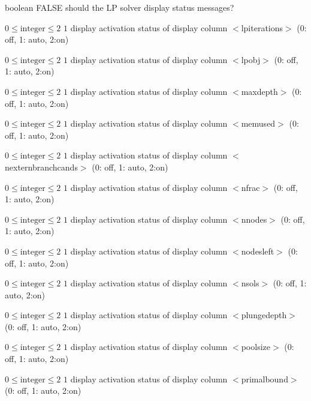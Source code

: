 %
{boolean}%
{FALSE}%
{should the LP solver display status messages?}%
{}

%
{$0\leq\textrm{integer}\leq2$}%
{$1$}%
{display activation status of display column $<$lpiterations$>$ (0: off, 1: auto, 2:on)}%
{}

%
{$0\leq\textrm{integer}\leq2$}%
{$1$}%
{display activation status of display column $<$lpobj$>$ (0: off, 1: auto, 2:on)}%
{}

%
{$0\leq\textrm{integer}\leq2$}%
{$1$}%
{display activation status of display column $<$maxdepth$>$ (0: off, 1: auto, 2:on)}%
{}

%
{$0\leq\textrm{integer}\leq2$}%
{$1$}%
{display activation status of display column $<$memused$>$ (0: off, 1: auto, 2:on)}%
{}

%
{$0\leq\textrm{integer}\leq2$}%
{$1$}%
{display activation status of display column $<$nexternbranchcands$>$ (0: off, 1: auto, 2:on)}%
{}

%
{$0\leq\textrm{integer}\leq2$}%
{$1$}%
{display activation status of display column $<$nfrac$>$ (0: off, 1: auto, 2:on)}%
{}

%
{$0\leq\textrm{integer}\leq2$}%
{$1$}%
{display activation status of display column $<$nnodes$>$ (0: off, 1: auto, 2:on)}%
{}

%
{$0\leq\textrm{integer}\leq2$}%
{$1$}%
{display activation status of display column $<$nodesleft$>$ (0: off, 1: auto, 2:on)}%
{}

%
{$0\leq\textrm{integer}\leq2$}%
{$1$}%
{display activation status of display column $<$nsols$>$ (0: off, 1: auto, 2:on)}%
{}

%
{$0\leq\textrm{integer}\leq2$}%
{$1$}%
{display activation status of display column $<$plungedepth$>$ (0: off, 1: auto, 2:on)}%
{}

%
{$0\leq\textrm{integer}\leq2$}%
{$1$}%
{display activation status of display column $<$poolsize$>$ (0: off, 1: auto, 2:on)}%
{}

%
{$0\leq\textrm{integer}\leq2$}%
{$1$}%
{display activation status of display column $<$primalbound$>$ (0: off, 1: auto, 2:on)}%
{}

